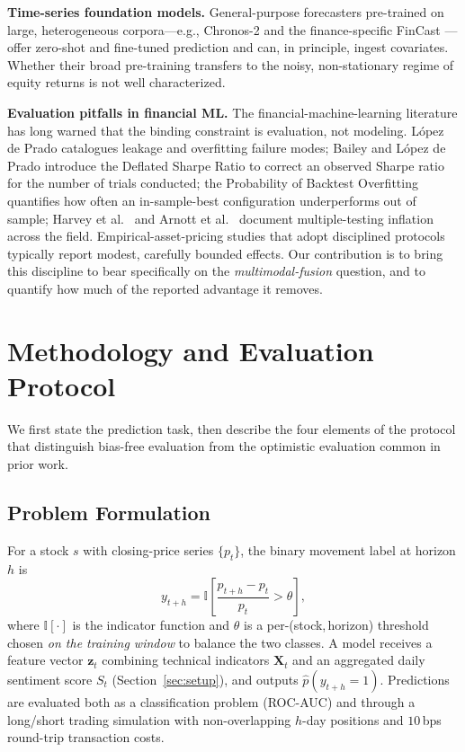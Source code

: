 \documentclass[conference]{IEEEtran}
\begin{document}
\noindent\textbf{Time-series foundation models.}
General-purpose forecasters pre-trained on large, heterogeneous corpora---e.g.,
Chronos-2 \cite{ansari2025chronos} and the finance-specific FinCast
\cite{zhu2025fincast}---offer zero-shot and fine-tuned prediction and can, in
principle, ingest covariates. Whether their broad pre-training transfers to the
noisy, non-stationary regime of equity returns is not well characterized.

\noindent\textbf{Evaluation pitfalls in financial ML.}
The financial-machine-learning literature has long warned that the binding
constraint is evaluation, not modeling. L\'opez de Prado \cite{prado2018}
catalogues leakage and overfitting failure modes; Bailey and L\'opez de Prado
\cite{bailey2014dsr} introduce the Deflated Sharpe Ratio to correct an observed
Sharpe ratio for the number of trials conducted; the Probability of Backtest
Overfitting \cite{bailey2016pbo} quantifies how often an in-sample-best
configuration underperforms out of sample; Harvey et al.\ \cite{harvey2016} and
Arnott et al.\ \cite{arnott2019} document multiple-testing inflation across the
field. Empirical-asset-pricing studies that adopt disciplined protocols
\cite{gu2020} typically report modest, carefully bounded effects. Our
contribution is to bring this discipline to bear specifically on the
\emph{multimodal-fusion} question, and to quantify how much of the reported
advantage it removes.

\section{
Methodology and Evaluation Protocol}
\label{sec:protocol}

We first state the prediction task, then describe the four elements of the
protocol that distinguish bias-free evaluation from the optimistic evaluation
common in prior work.

\subsection{Problem Formulation}
For a stock $s$ with closing-price series $\{p_t\}$, the binary movement label
at horizon $h$ is
\begin{equation}
y_{t+h} = \mathbb{I}\!\left[\frac{p_{t+h}-p_t}{p_t} > \theta\right],
\end{equation}
where $\mathbb{I}[\cdot]$ is the indicator function and $\theta$ is a
per-(stock,\,horizon) threshold chosen \emph{on the training window} to
balance the two classes. A model receives a feature vector $\mathbf{z}_t$
combining technical indicators $\mathbf{X}_t$ and an aggregated daily sentiment
score $S_t$ (Section~\ref{sec:setup}), and outputs $\hat{p}(y_{t+h}=1)$.
Predictions are evaluated both as a classification problem (ROC-AUC) and
through a long/short trading simulation with non-overlapping $h$-day positions
and $10$\,bps round-trip transaction costs.
\end{document}
